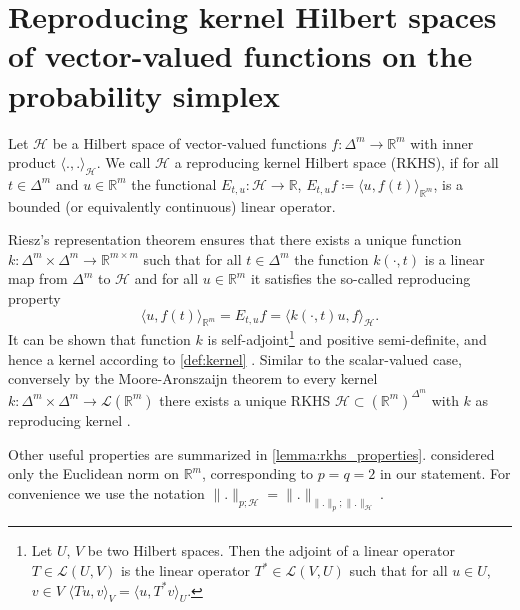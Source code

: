 \documentclass{article}
\begin{document}
\section{Reproducing kernel Hilbert spaces of vector-valued functions on the probability simplex}\label{app:rkhs}

\begin{definition}\label{def:rkhs}
  Let $\mathcal{H}$ be a Hilbert space of vector-valued functions
  $f \colon \Delta^m \to \mathbb{R}^m$ with inner product
  $\langle ., . \rangle_{\mathcal{H}}$. We call $\mathcal{H}$ a reproducing
  kernel Hilbert space (RKHS), if for all $t \in \Delta^m$ and
  $u \in \mathbb{R}^m$ the functional $E_{t,u} \colon \mathcal{H} \to \mathbb{R}$,
  $E_{t,u} f \coloneqq \langle u, f(t) \rangle_{\mathbb{R}^m}$, is a bounded (or
  equivalently continuous) linear operator.
\end{definition}

Riesz's representation theorem ensures that there exists a unique function
$k \colon \Delta^m \times \Delta^m \to \mathbb{R}^{m \times m}$ such that for
all $t \in \Delta^m$ the function $k(\cdot, t)$ is a linear map from $\Delta^m$
to $\mathcal{H}$ and for all $u \in \mathbb{R}^m$ it satisfies the so-called
reproducing property
\begin{equation}\label{eq:reproducing_property}
  \langle u, f(t) \rangle_{\mathbb{R}^m} = E_{t,u}f = \langle k(\cdot, t) u, f\rangle_{\mathcal{H}}.
\end{equation}
It can be shown that function $k$ is self-adjoint\footnote{Let $U$, $V$ be two
  Hilbert spaces. Then the adjoint of a linear operator
  $T \in \mathcal{L}(U, V)$ is the linear operator $T^* \in \mathcal{L}(V, U)$
  such that for all $u \in U$, $v \in V$
  $\langle Tu, v\rangle_{V} = \langle u, T^*v \rangle_U$.} and positive
semi-definite, and hence a kernel according to \cref{def:kernel}
\citep[Proposition~1]{micchelli05_learn_vector_valued_funct}. Similar to the
scalar-valued case, conversely by the Moore-Aronszaijn theorem
\citep{aronszajn50_theor_reprod_kernel} to every kernel
$k \colon \Delta^m \times \Delta^m \to \mathcal{L}(\mathbb{R}^m)$ there exists a
unique RKHS $\mathcal{H} \subset {(\mathbb{R}^m)}^{\Delta^m}$ with $k$ as
reproducing kernel \citep[][Theorem~1]{micchelli05_learn_vector_valued_funct}.

Other useful properties are summarized in \cref{lemma:rkhs_properties}.
 considered only the Euclidean norm
on $\mathbb{R}^m$, corresponding to $p = q = 2$ in our statement. For
convenience we use the notation
$\|.\|_{p; \mathcal{H}} = \|.\|_{\|.\|_p; \|.\|_{\mathcal{H}}}$.
\end{document}
